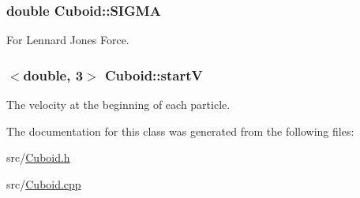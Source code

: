 \hypertarget{classCuboid_a88c7ddda07e9eb992c8b549ca1f6e827}{
\subsubsection[{S\-I\-G\-M\-A}]{\setlength{\rightskip}{0pt plus 5cm}double Cuboid\-::\-S\-I\-G\-M\-A\hspace{0.3cm}{\ttfamily [private]}}}\label{classCuboid_a88c7ddda07e9eb992c8b549ca1f6e827}
For Lennard Jones Force. \hypertarget{classCuboid_a7a95bfb80c884e9f96642c9f7043e9e1}{
\subsubsection[{start\-V}]{$<$double, 3$>$ Cuboid\-::start\-V\hspace{0.3cm}{\ttfamily [private]}}}\label{classCuboid_a7a95bfb80c884e9f96642c9f7043e9e1}
The velocity at the beginning of each particle. 

The documentation for this class was generated from the following files\-:\begin{DoxyCompactItemize}
\item 
src/\hyperlink{Cuboid_8h}{Cuboid.\-h}\item 
src/\hyperlink{Cuboid_8cpp}{Cuboid.\-cpp}\end{DoxyCompactItemize}
